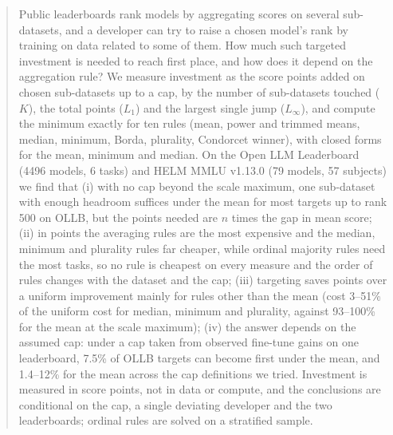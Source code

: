 \begin{abstract}
Public leaderboards rank models by aggregating scores on several sub-datasets, and a developer can try to raise a chosen model's rank by training on data related to some of them. How much such targeted investment is needed to reach first place, and how does it depend on the aggregation rule? We measure investment as the score points added on chosen sub-datasets up to a cap, by the number of sub-datasets touched ($K$), the total points ($L_1$) and the largest single jump ($L_\infty$), and compute the minimum exactly for ten rules (mean, power and trimmed means, median, minimum, Borda, plurality, Condorcet winner), with closed forms for the mean, minimum and median. On the Open LLM Leaderboard (4496 models, 6 tasks) and HELM MMLU v1.13.0 (79 models, 57 subjects) we find that (i) with no cap beyond the scale maximum, one sub-dataset with enough headroom suffices under the mean for most targets up to rank 500 on OLLB, but the points needed are $n$ times the gap in mean score; (ii) in points the averaging rules are the most expensive and the median, minimum and plurality rules far cheaper, while ordinal majority rules need the most tasks, so no rule is cheapest on every measure and the order of rules changes with the dataset and the cap; (iii) targeting saves points over a uniform improvement mainly for rules other than the mean (cost 3--51\% of the uniform cost for median, minimum and plurality, against 93--100\% for the mean at the scale maximum); (iv) the answer depends on the assumed cap: under a cap taken from observed fine-tune gains on one leaderboard, 7.5\% of OLLB targets can become first under the mean, and 1.4--12\% for the mean across the cap definitions we tried. Investment is measured in score points, not in data or compute, and the conclusions are conditional on the cap, a single deviating developer and the two leaderboards; ordinal rules are solved on a stratified sample.
\end{abstract}
